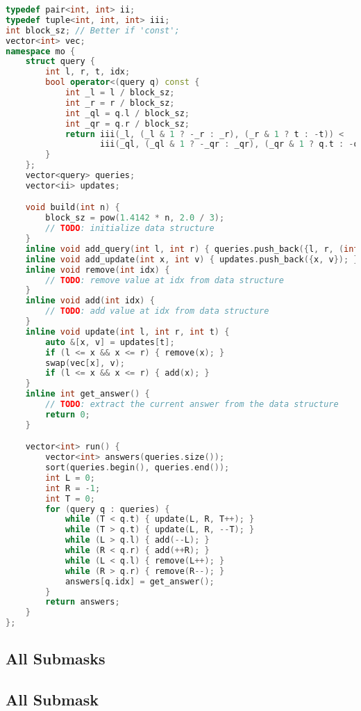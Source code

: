 \documentclass[11pt, a4paper, twoside]{article}
\begin{document}
\begin{lstlisting}[language=C++]
typedef pair<int, int> ii;
typedef tuple<int, int, int> iii;
int block_sz; // Better if 'const';
vector<int> vec;
namespace mo {
    struct query {
        int l, r, t, idx;
        bool operator<(query q) const {
            int _l = l / block_sz;
            int _r = r / block_sz;
            int _ql = q.l / block_sz;
            int _qr = q.r / block_sz;
            return iii(_l, (_l & 1 ? -_r : _r), (_r & 1 ? t : -t)) <
                   iii(_ql, (_ql & 1 ? -_qr : _qr), (_qr & 1 ? q.t : -q.t));
        }
    };
    vector<query> queries;
    vector<ii> updates;

    void build(int n) {
        block_sz = pow(1.4142 * n, 2.0 / 3);
        // TODO: initialize data structure
    }
    inline void add_query(int l, int r) { queries.push_back({l, r, (int)updates.size(), (int)queries.size()}); }
    inline void add_update(int x, int v) { updates.push_back({x, v}); }
    inline void remove(int idx) {
        // TODO: remove value at idx from data structure
    }
    inline void add(int idx) {
        // TODO: add value at idx from data structure
    }
    inline void update(int l, int r, int t) {
        auto &[x, v] = updates[t];
        if (l <= x && x <= r) { remove(x); }
        swap(vec[x], v);
        if (l <= x && x <= r) { add(x); }
    }
    inline int get_answer() {
        // TODO: extract the current answer from the data structure
        return 0;
    }

    vector<int> run() {
        vector<int> answers(queries.size());
        sort(queries.begin(), queries.end());
        int L = 0;
        int R = -1;
        int T = 0;
        for (query q : queries) {
            while (T < q.t) { update(L, R, T++); }
            while (T > q.t) { update(L, R, --T); }
            while (L > q.l) { add(--L); }
            while (R < q.r) { add(++R); }
            while (L < q.l) { remove(L++); }
            while (R > q.r) { remove(R--); }
            answers[q.idx] = get_answer();
        }
        return answers;
    }
};
\end{lstlisting}

\subsection{All Submasks}

\subsection{All Submask}
\end{document}
